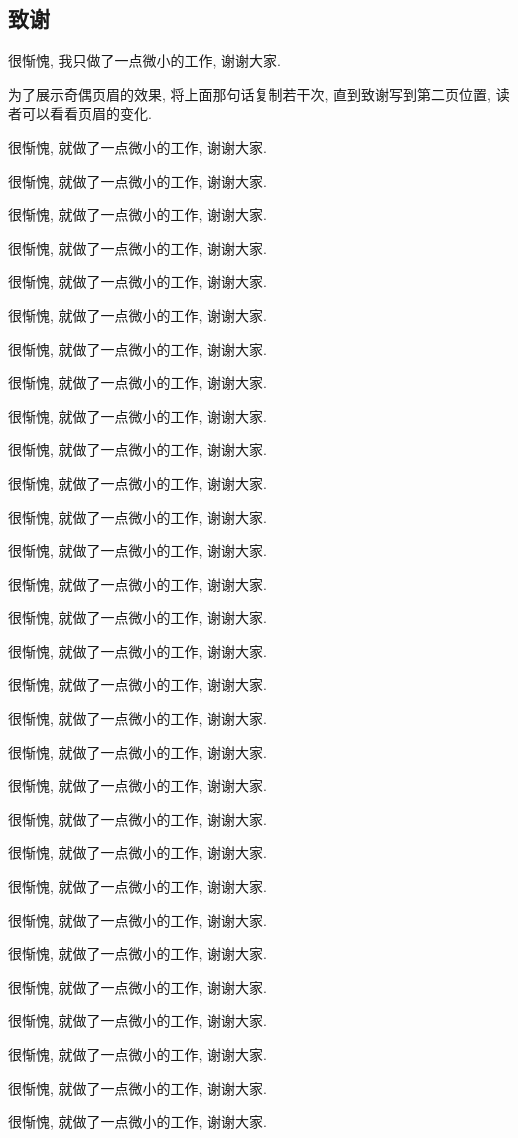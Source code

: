 \documentclass[a4paper]{article}
\begin{document}
\begin{spacing}{1.5}
\section*{致谢}
很惭愧, 我只做了一点微小的工作, 谢谢大家.

为了展示奇偶页眉的效果, 将上面那句话复制若干次, 直到致谢写到第二页位置, 读者可以看看页眉的变化.

很惭愧, 就做了一点微小的工作, 谢谢大家.

很惭愧, 就做了一点微小的工作, 谢谢大家.

很惭愧, 就做了一点微小的工作, 谢谢大家.

很惭愧, 就做了一点微小的工作, 谢谢大家.

很惭愧, 就做了一点微小的工作, 谢谢大家.

很惭愧, 就做了一点微小的工作, 谢谢大家.

很惭愧, 就做了一点微小的工作, 谢谢大家.

很惭愧, 就做了一点微小的工作, 谢谢大家.

很惭愧, 就做了一点微小的工作, 谢谢大家.

很惭愧, 就做了一点微小的工作, 谢谢大家.

很惭愧, 就做了一点微小的工作, 谢谢大家.

很惭愧, 就做了一点微小的工作, 谢谢大家.

很惭愧, 就做了一点微小的工作, 谢谢大家.

很惭愧, 就做了一点微小的工作, 谢谢大家.

很惭愧, 就做了一点微小的工作, 谢谢大家.

很惭愧, 就做了一点微小的工作, 谢谢大家.

很惭愧, 就做了一点微小的工作, 谢谢大家.

很惭愧, 就做了一点微小的工作, 谢谢大家.

很惭愧, 就做了一点微小的工作, 谢谢大家.

很惭愧, 就做了一点微小的工作, 谢谢大家.

很惭愧, 就做了一点微小的工作, 谢谢大家.

很惭愧, 就做了一点微小的工作, 谢谢大家.

很惭愧, 就做了一点微小的工作, 谢谢大家.

很惭愧, 就做了一点微小的工作, 谢谢大家.

很惭愧, 就做了一点微小的工作, 谢谢大家.

很惭愧, 就做了一点微小的工作, 谢谢大家.

很惭愧, 就做了一点微小的工作, 谢谢大家.

很惭愧, 就做了一点微小的工作, 谢谢大家.

很惭愧, 就做了一点微小的工作, 谢谢大家.

很惭愧, 就做了一点微小的工作, 谢谢大家.

\end{spacing}
\end{document}
